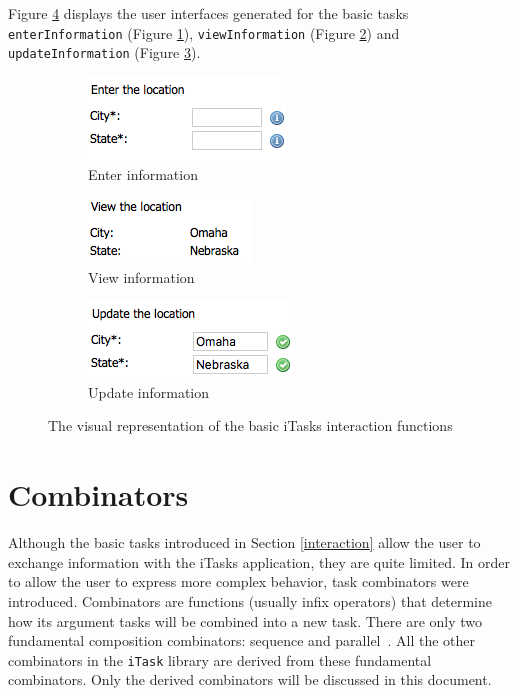 Figure \ref{fig:itasks_display} displays the user interfaces generated for the basic tasks \texttt{enterInformation} (Figure \ref{fig:enter_info}), \texttt{viewInformation} (Figure \ref{fig:view_info}) and \texttt{updateInformation} (Figure \ref{fig:upd_info}).

\begin{figure}[H]
\begin{subfigure}{0.33\textwidth}
\includegraphics[scale=0.7]{thesis/img/enter_location.png}
\caption{Enter information}
\label{fig:enter_info}
\end{subfigure}
\begin{subfigure}{0.33\textwidth}
\includegraphics[scale=0.55]{thesis/img/view_location.png}
\caption{View information}
\label{fig:view_info}
\end{subfigure}
\begin{subfigure}{0.33\textwidth}
\includegraphics[scale=0.7]{thesis/img/update_location.png}
\caption{Update information}
\label{fig:upd_info}
\end{subfigure}
\caption{The visual representation of the basic \gls{iTasks} interaction functions}
\label{fig:itasks_display}
\end{figure}


\section{Combinators}\label{combinators}

Although the basic tasks introduced in Section \ref{interaction} allow the user to exchange information with the \gls{iTasks} application, they are quite limited. In order to allow the user to express more complex behavior, task combinators were introduced. Combinators are functions (usually infix operators) that determine how its argument tasks will be combined into a new task. There are only two fundamental composition combinators: sequence and parallel~\cite{top_fl}. All the other combinators in the \texttt{iTask} library are derived from these fundamental combinators. Only the derived combinators will be discussed in this document.

